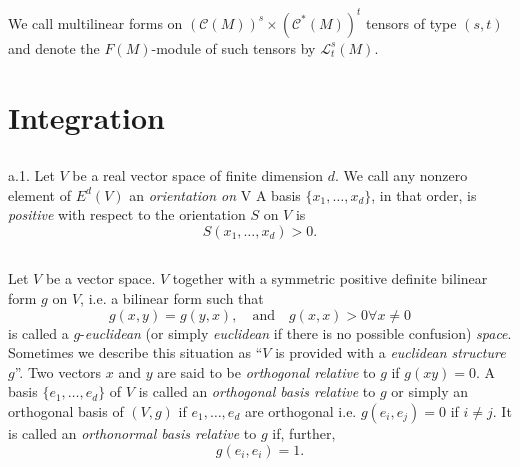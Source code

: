 \setcounter{subsection}{11}
\subsection{}\label{chap0:0.2.12}\pageoriginale

We call multilinear forms on $(\mathscr{C}(M))^{s}\times
(\mathscr{C}^{\ast}(M))^{t}$ tensors of type $(s,t)$ and denote the
$F(M)$-module of such tensors by $\mathscr{L}^{s}_{t}(M)$.

\section{Integration}\label{chap0:sec3}

\subsection{}\label{chap0:0.3.1}

a.1. Let $V$ be a real vector space of finite dimension $d$. We call
any nonzero element of $E^{d}(V)$ an {\em orientation on} V A basis
$\{x_{1},\ldots,x_{d}\}$, in that order, is {\em positive} with
respect to the orientation $S$ on $V$ is
\begin{equation*}\label{chap0:0.3.2}
S(x_{1},\ldots,x_{d})>0.\tag{0.3.2}
\end{equation*}

\setcounter{subsection}{2}
\subsection{}\label{chap0:0.3.3}

Let $V$ be a vector space. $V$ together with a symmetric positive
definite bilinear form $g$ on $V$, i.e. a bilinear form such that
$$
g(x,y)=g(y,x),\quad\text{and}\quad g(x,x)>0\forall x\neq 0
$$
is called a $g$-{\em euclidean} (or simply {\em euclidean} if there is
no possible confusion) {\em space}. Sometimes we describe this
situation as ``$V$ is provided with a {\em euclidean structure}
$g$''. Two vectors $x$ and $y$ are said to be {\em orthogonal
  relative} to $g$ if $g(xy)=0$. A basis $\{e_{1},\ldots,e_{d}\}$ of
$V$ is called an {\em orthogonal basis relative} to $g$ or simply an
orthogonal basis of $(V,g)$ if $e_{1},\ldots,e_{d}$ are orthogonal
i.e. $g(e_{i},e_{j})=0$ if $i\neq j$. It is called an {\em orthonormal
  basis relative} to $g$ if, further,
$$
g(e_{i},e_{i})=1.
$$

\subsection{}\label{chap0:0.3.4}

